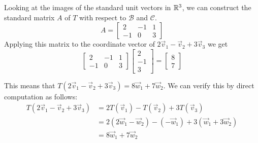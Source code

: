 \documentclass{ximera}
\begin{document}
\begin{example}
\begin{explanation}
\begin{center}
\end{center}

Looking at the images of the standard unit vectors in $\mathbb{R}^3$, we can construct the standard matrix $A$ of $T$ with respect to $\mathcal{B}$ and $\mathcal{C}$. 
$$A=\begin{bmatrix}2&-1&1\\-1&0&3\end{bmatrix}$$
Applying this matrix to the coordinate vector of $2\vec{v}_1-\vec{v}_2+3\vec{v}_3$ we get
$$\begin{bmatrix}2&-1&1\\-1&0&3\end{bmatrix}\begin{bmatrix}2\\-1\\3\end{bmatrix}=\begin{bmatrix}8\\7\end{bmatrix}$$

This means that $T(2\vec{v}_1-\vec{v}_2+3\vec{v}_3)=8\vec{w}_1+7\vec{w}_2$.
We can verify this by direct computation as follows:
\begin{align*}
T(2\vec{v}_1-\vec{v}_2+3\vec{v}_3)&=2T(\vec{v}_1)-T(\vec{v}_2)+3T(\vec{v}_3)\\&=2(2\vec{w}_1-\vec{w}_2)-(-\vec{w}_1)+3(\vec{w}_1+3\vec{w}_2)\\&=8\vec{w}_1+7\vec{w}_2
\end{align*}
\end{explanation}

\end{example}
\end{document}
